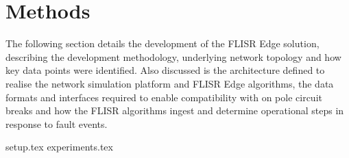 \section{Methods}
\label{sec:methods}

The following section details the development of the FLISR Edge solution, describing the development methodology, underlying network topology and how key data points were identified.
Also discussed is the architecture defined to realise the network simulation platform and FLISR Edge algorithms, the data formats and interfaces required to enable compatibility with on pole circuit breaks and how the FLISR algorithms ingest and
determine operational steps in response to fault events.

{setup.tex}
{experiments.tex}

